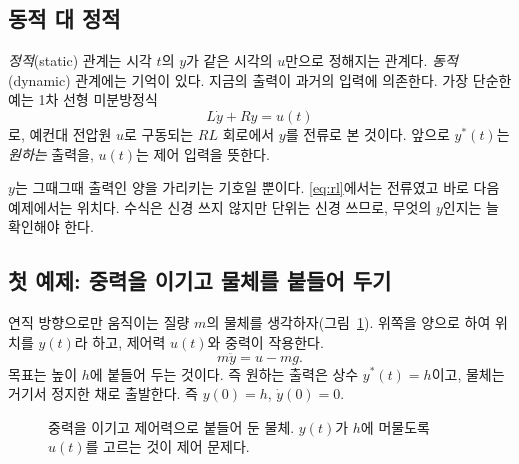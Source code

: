 \documentclass[11pt]{article}
\begin{document}
\subsection{동적 대 정적} \emph{정적}(static) 관계는 시각 $t$의 $y$가 같은 시각의
$u$만으로 정해지는 관계다. \emph{동적}(dynamic) 관계에는 기억이 있다. 지금의
출력이 과거의 입력에 의존한다. 가장 단순한 예는 1차 선형 미분방정식
\begin{equation}\label{eq:rl}
   L\dot y + Ry = u(t)
\end{equation}
로, 예컨대 전압원 $u$로 구동되는 $RL$ 회로에서 $y$를 전류로 본 것이다. 앞으로
$y^{*}(t)$는 \emph{원하는} 출력을, $u(t)$는 제어 입력을 뜻한다.

\begin{note}
$y$는 그때그때 출력인 양을 가리키는 기호일 뿐이다. \eqref{eq:rl}에서는 전류였고
바로 다음 예제에서는 위치다. 수식은 신경 쓰지 않지만 단위는 신경 쓰므로, 무엇의
$y$인지는 늘 확인해야 한다.
\end{note}

\subsection{첫 예제: 중력을 이기고 물체를 붙들어 두기}
연직 방향으로만 움직이는 질량 $m$의 물체를 생각하자(그림~\ref{fig:mass}).
위쪽을 양으로 하여 위치를 $y(t)$라 하고, 제어력 $u(t)$와 중력이 작용한다.
\begin{equation}\label{eq:mass}
   m\ddot y = u - mg .
\end{equation}
목표는 높이 $h$에 붙들어 두는 것이다. 즉 원하는 출력은 상수 $y^{*}(t)=h$이고,
물체는 거기서 정지한 채로 출발한다. 즉 $y(0)=h$, $\dot y(0)=0$.

\begin{figure}[htb]
\centering
{}
\caption{중력을 이기고 제어력으로 붙들어 둔 물체. $y(t)$가 $h$에 머물도록
$u(t)$를 고르는 것이 제어 문제다.}
\label{fig:mass}
\end{figure}
\end{document}

